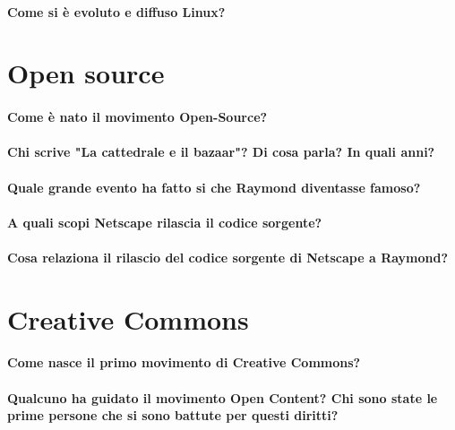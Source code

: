 \documentclass[a4paper]{article}
\begin{document}
		\paragraph{Come si è evoluto e diffuso Linux?}
	
	
	\section{Open source}
	
		\paragraph{Come è nato il movimento Open-Source?}
		
		\paragraph{Chi scrive "La cattedrale e il bazaar"? Di cosa parla? In quali anni?}
		
		\paragraph{Quale grande evento ha fatto si che Raymond diventasse famoso?}
		
		\paragraph{A quali scopi Netscape rilascia il codice sorgente?}
		
		\paragraph{Cosa relaziona il rilascio del codice sorgente di Netscape a Raymond?}
		
		
	\section{Creative Commons}
	
		\paragraph{Come nasce il primo movimento di Creative Commons?}
		
		\paragraph{Qualcuno ha guidato il movimento Open Content? Chi sono state le prime persone che si sono battute per questi diritti?}
		
\end{document}
